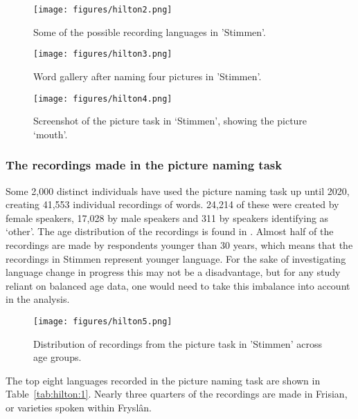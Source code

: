 \documentclass[output=paper,hidelinks]{langscibook}
\begin{document}
\begin{figure}
  \texttt{[image: figures/hilton2.png]}
  \caption{Some of the possible recording languages in 'Stimmen'.}
 \label{fig:hilton:2}
\end{figure}

\begin{figure}
  \texttt{[image: figures/hilton3.png]}
  \caption{Word gallery after naming four pictures in 'Stimmen'.}
 \label{fig:hilton:3}
\end{figure}

\begin{figure}
  \texttt{[image: figures/hilton4.png]}
  \caption{Screenshot of the picture task in ‘Stimmen’, showing the picture ‘mouth’.}
 \label{fig:hilton:4}
\end{figure}

\subsubsection{The recordings made in the picture naming task}


Some 2,000 distinct individuals have used the picture naming task up until 2020, creating 41,553 individual recordings of words. 24,214 of these were created by female speakers, 17,028 by male speakers and 311 by speakers identifying as ‘other’. The age distribution of the recordings is found in . Almost half of the recordings are made by respondents younger than 30 years, which means that the recordings in Stimmen represent younger language. For the sake of investigating language change in progress this may not be a disadvantage, but for any study reliant on balanced age data, one would need to take this imbalance into account in the analysis.


\begin{figure}
  \texttt{[image: figures/hilton5.png]}
  \caption{Distribution of recordings from the picture task in 'Stimmen' across age groups.}
 \label{fig:hilton:5}
\end{figure}

\largerpage
The top eight languages recorded in the picture naming task are shown in Table~\ref{tab:hilton:1}. Nearly three quarters of the recordings are made in Frisian, or varieties spoken within Fryslân.
\end{document}
